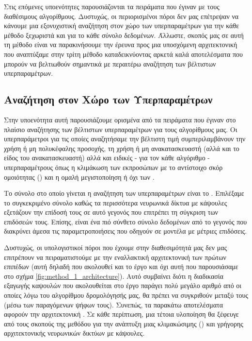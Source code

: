 Στις επόμενες υπο\textendash ενότητες παρουσιάζονται τα πειράματα που έγιναν με τους διαθέσιμους αλγορίθμους. Δυστυχώς, οι περιορισμένοι πόροι δεν μας επέτρεψαν να κάνουμε μια εξονυχιστική αναζήτηση στον χώρο των υπερπαραμέτρων για την κάθε μέθοδο ξεχωριστά και για το κάθε σύνολο δεδομένων. Άλλωστε, σκοπός μας σε αυτή τη μέθοδο είναι να παρακινήσουμε την έρευνα προς μια υποσχόμενη αρχιτεκτονική που αναπτύξαμε στην τρίτη μέθοδο καταδεικνύοντας αρκετά καλά αποτελέσματα που μπορούν να βελτιωθούν σημαντικά με περαιτέρω αναζήτηση των βέλτιστων υπερπαραμέτρων.\par

\subsection{Αναζήτηση στον Χώρο των Υπερπαραμέτρων}
Στην υποενότητα αυτή παρουσιάζουμε ορισμένα από τα πειράματα που έγιναν στο πλαίσιο αναζήτησης των βέλτιστων υπερπαραμέτρων για τους αλγορίθμους μας. Οι υπερπαράμετροι για τις οποίες αναζητήσαμε την βέλτιστη τιμή συμπεριλαμβάνουν την χρήση ή μη πολυκέφαλης προσοχής, τη χρήση ή μη ανακατασκευαστή (αλλά και το είδος του ανακατασκευαστή) αλλά και ειδικές - για τον κάθε αλγόριθμο - υπερπαραμέτρους όπως η κλιμάκωση των εκπροσώπων με το αντίστοιχο σκόρ ομοιότητας () και η ομαλή μεγιστοποίηση ή όχι των .\par

Το σύνολο στο οποίο γίνεται η αναζήτηση των υπερπαραμέτρων είναι το . Επιλέξαμε το συγκεκριμένο σύνολο καθώς τα περισσότερα νευρωνικά δίκτυα με κάψουλες εξετάζουν την επίδοσή τους σε αυτό γεγονός που επιτρέπει τη σύγκριση των επιδόσεών τους. Επίσης, είναι ένα πιό σύνθετο σύνολο δεδομένων από το  γεγονός που διακρύνει άμεσα τις παραμετροποιήσεις που οδηγούν σε μοντέλα με μέτριες επιδόσεις.\par

Δυστυχώς, οι υπολογιστικοί πόροι που έχουμε στην διαθεσιμότητά μας δεν μας επιτρέπουν να πειραματιστούμε με την εναλλακτική αρχιτεκτονική των πρώτων επιπέδων (αυτή δηλαδή που ακολουθεί και το έργο \cite{hinton2018matrix} και όχι αυτή που παρουσιάσαμε στο σχήμα \ref{fig:method_1_architecture}). Αυτό συμβαίνει διότι η διαδικασία εξαγωγής καψουλών που ακολουθείται στο έργο \cite{sabour2017dynamic} παράγει πολύ μεγάλο αριθμό από  οι οποίες λόγω του αλγορίθμου δρομολόγησής μας, θα πρέπει να συγκριθούν μεταξύ τους (μέσω των παραγόμενων ψήφων τους). Συνεπώς, τα παρακάτω αποτελέσματα αφορούν την αρχιτεκτονική . Σε κάθε περίπτωση, μια τέτοια υλοποίηση θα ξέφευγε από τους σκοπούς της μεθόδου για την ανάπτυξη μιας κλιμακώσιμης () και γρήγορης αρχιτεκτονικής νευρωνικών δικτύων με κάψουλες.\par

